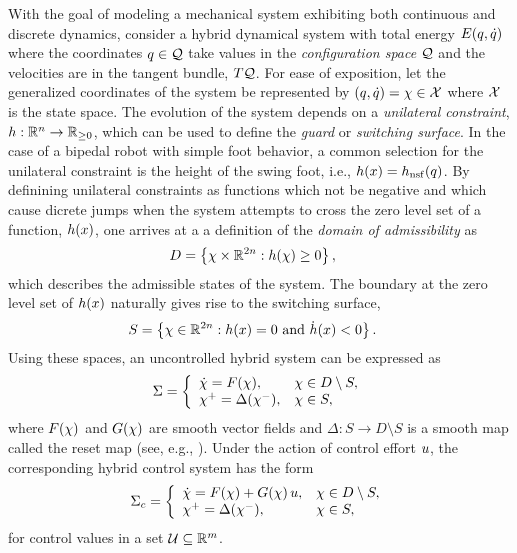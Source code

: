 With the goal of modeling a mechanical system exhibiting both continuous and discrete dynamics, consider a hybrid dynamical system with total energy $E(q, \dot{q})$ where the coordinates $q \in \mathcal{Q}$ take values in the {\em configuration space} $\mathcal{Q}$ and the velocities are in the tangent bundle, $T\mathcal{Q}$.
%
For ease of exposition, let the generalized coordinates of the system be represented by $(q, \dot{q}) = \chi \in \mathcal{X}$ where $\mathcal{X}$ is the state space.
%
The evolution of the system depends on a {\em unilateral constraint}, $h : \mathbb{R}^{n} \to \mathbb{R}_{\geq 0}$, which can be used to define the {\em guard} or {\em switching surface}.
%
In the case of a bipedal robot with simple foot behavior, a common selection for the unilateral constraint is the height of the swing foot, i.e., $h(x) = h_{\mathrm{nsf}}(q)$.
%
By definining unilateral constraints as functions which not be negative and which cause dicrete jumps when the system attempts to cross the zero level set of a function, $h(x)$, one arrives at a a definition of the {\em domain of admissibility} as
%
\begin{align}
  \label{eq:domain}
  D &= \left\{ \chi \times \mathbb{R}^{2n} : h(\chi) \geq 0 \right\},
\end{align}
%
which describes the admissible states of the system.
%
The boundary at the zero level set of $h(x)$ naturally gives rise to the switching surface,
%
\begin{align}
  \label{eq:guard}
  S &= \left\{ \chi \in \mathbb{R}^{2n} : h(x) = 0 \mbox{ and } {\dot h}(x) < 0 \right\}.
\end{align}
%
Using these spaces, an uncontrolled hybrid system can be expressed as
%
\begin{align}
  \Sigma = \left\{
  \begin{array}{l l}
    {\dot {\chi}} = F(\chi), & \chi \in D \setminus S,\\
    \chi^{+} = \Delta(\chi^{-}), & \chi \in S,
  \end{array}\right.
  \label{eq:hsys}
\end{align}
%
where $F(\chi)$ and $G(\chi)$ are smooth vector fields and $\Delta : S \to D \setminus S$ is a smooth map called the reset map (see, e.g., \cite{MoGr05}).
%
Under the action of control effort $u$, the corresponding hybrid control system has the form
%
\begin{align}
  \Sigma_{c} = \left\{
  \begin{array}{l l}
    {\dot {\chi}} = F(\chi) + G(\chi) \, u, & \chi \in D \setminus S,\\
    \chi^{+} = \Delta(\chi^{-}), & \chi \in S,
  \end{array}\right.
  \label{eq:hcsys}
\end{align}
%
for control values in a set $\mathcal{U} \subseteq \mathbb{R}^{m}$.
%


